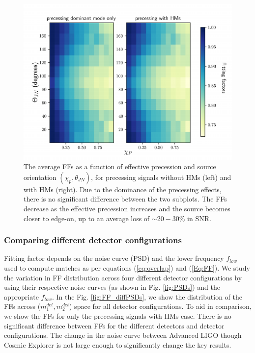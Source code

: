  \begin{figure}
    \centering
    \includegraphics[width=\linewidth]{figures/HM_and_precession/aLIGO_FF_spins.pdf}
    \caption{ The average FFs as a function of effective precession and source orientation $(\chi_p, \theta_{JN})$, for precessing signals without HMs (left) and with HMs (right). Due to the dominance of the precessing effects, there is no significant difference between the two subplots. The  FFs decrease as the effective precession increases and the source becomes closer to edge-on, up to an average loss of $\sim20-30\%$ in SNR.}
    \label{fig:chi-theta}
\end{figure}

\subsubsection{Comparing different detector configurations}

Fitting factor depends on the noise curve (PSD) and the lower frequency $f_{low}$ used to compute matches as per equations (\ref{eq:overlap}) and (\ref{Eq:FF}). We study the variation in FF distribution across four different detector configurations by using their respective noise curves (as shown in Fig. \ref{fig:PSDs}) and the appropriate $f_{low}$. 
In the Fig. \ref{fig:FF_diffPSDs}, we show the distribution of the FFs across ($m_1^{det}, m_2^{det}$) space for all detector configurations. To aid in comparison, we show the FFs for only the precessing signals with HMs case. There is no significant difference between FFs for the different detectors and detector configurations. The change in the noise curve between Advanced LIGO though Cosmic Explorer is not large enough to significantly change the key results.

